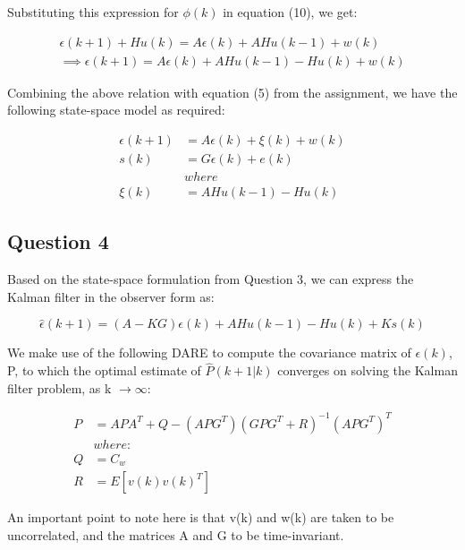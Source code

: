 \documentclass[12pt]{report}
\begin{document}
Substituting this expression for $\phi(k)$ in equation (10), we get:

\begin{equation*}
\begin{aligned}
\epsilon(k+1) + Hu(k) = A\epsilon(k) + AHu(k-1) + w(k)\\
\implies \epsilon(k+1) = A\epsilon(k) + AHu(k-1) - Hu(k) + w(k)
\end{aligned}
\end{equation*} 

Combining the above relation with equation (5) from the assignment, we have the following state-space model as required:

\begin{equation*}
\begin{aligned}
\epsilon(k+1) &= A\epsilon(k) + \xi(k) + w(k)\\
s(k) &= G\epsilon(k) + e(k)\\
&where\\
\xi(k) &= AHu(k-1) - Hu(k)
\end{aligned}
\end{equation*} 

\subsection*{Question 4}

Based on the state-space formulation from Question 3, we can express the Kalman filter in the observer form as:

\begin{equation*}
	\hat\epsilon(k+1) = (A - KG)\epsilon(k) + AHu(k-1) - Hu(k) + Ks(k)
\end{equation*}

We make use of the following DARE to compute the covariance matrix of $\epsilon(k)$, P, to which the optimal estimate of $\hat P(k+1|k)$ converges on solving the Kalman filter problem, as k $\rightarrow \infty$:

\begin{equation*}
\begin{aligned}
P &= APA^{T} + Q - (APG^{T})(GPG^{T} + R)^{-1}(APG^{T})^{T}\\
&where:\\
Q &= C_{w}\\
R &= E[v(k)v(k)^{T}]
\end{aligned}
\end{equation*}

An important point to note here is that v(k) and w(k) are taken to be uncorrelated, and the matrices A and G to be time-invariant.
\end{document}
